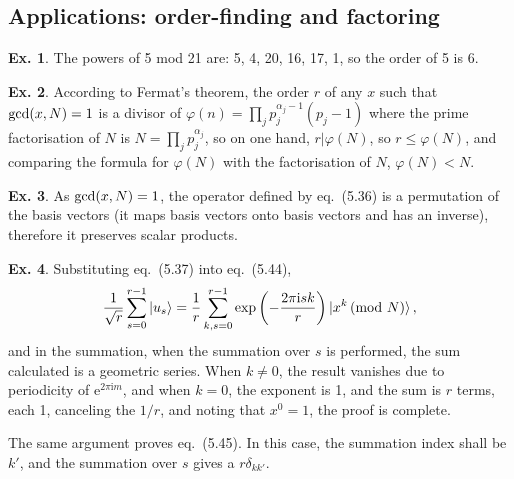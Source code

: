 \documentclass[a4paper,12pt]{article}
\def\e{\mathrm{e}}
\def\imagi{\mathrm{i}}
\theoremstyle{definition}
\newtheorem{exercise}{Ex.}[section]
\begin{document}
\subsection{Applications: order-finding and factoring}\label{ssec:applications}

\begin{exercise}
 The powers of 5 mod 21 are: 5, 4, 20, 16, 17, 1, so the order of 5 is 6.
\end{exercise}

\begin{exercise}
 According to Fermat's theorem, the order $r$ of any $x$ such that ${\rm gcd}(x, N)=1$ is a divisor of $\varphi(n)=\prod_j p_j^{\alpha_j-1}(p_j-1)$ where the prime factorisation of $N$ is $N=\prod_j p_j^{\alpha_j}$, so on one hand, $r|\varphi(N)$, so $r \le \varphi(N)$, and comparing the formula for $\varphi(N)$ with the factorisation of $N$, $\varphi(N) < N$.
\end{exercise}


\begin{exercise}
 As ${\rm gcd}(x, N)=1$, the operator defined by eq.~(5.36) is a permutation of the basis vectors (it maps basis vectors onto basis vectors and has an inverse), therefore it preserves scalar products.
\end{exercise}

\begin{exercise} Substituting eq.~(5.37) into eq.~(5.44),
 \[
  \frac{1}{\sqrt{r}}\sum_{s=0}^{r-1}|u_s\rangle = \frac{1}{r}\sum_{k,s=0}^{r-1}\exp\left(-\frac{2\pi\imagi sk}{r}\right)|x^k\,({\rm mod}\ N)\rangle\,,
 \]
 and in the summation, when the summation over $s$ is performed, the sum calculated is a geometric series. When $k\ne 0$, the result vanishes due to periodicity of $\e^{2\pi\imagi m}$, and when $k=0$, the exponent is 1, and the sum is $r$ terms, each 1, canceling the $1/r$, and noting that $x^0=1$, the proof is complete.
 
 The same argument proves eq.~(5.45). In this case, the summation index shall be $k'$, and the summation over $s$ gives a $r\delta_{kk'}$.
\end{exercise}
\end{document}

